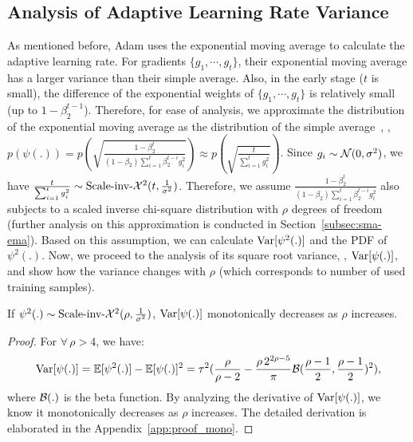 \vspace{-0.1cm}
\subsection{Analysis of Adaptive Learning Rate Variance}
\vspace{-0.1cm}
As mentioned before, Adam uses the exponential moving average to calculate the adaptive learning rate. 
For gradients $\{g_1, \cdots, g_t\}$, their exponential moving average has a larger variance than their simple average. 
Also, in the early stage ($t$ is small), the difference of the exponential weights of $\{g_1, \cdots, g_t\}$ is relatively small (up to $1 - \beta_2^{t-1}$).
Therefore, for ease of analysis, we approximate the distribution of the exponential moving average as the distribution of the simple average~\citep{nau2014forecasting}, \ie, $p(\psi(.)) = p(\sqrt{\frac{1-\beta_2^t}{(1 - \beta_2)\sum_{i = 1}^t \beta_2^{t-i}g_i^2}}) \approx p(\sqrt{\frac{t}{\sum_{i=1}^t g_i^2}})$. Since $g_i \sim {\mathcal{N}}(0, \sigma^2)$, we have $\frac{t}{\sum_{i=1}^t g_i^2} \sim \mbox{Scale-inv-}\mathcal{X}^2(t, \frac{1}{\sigma^2})$. 
Therefore, we assume $\frac{1-\beta_2^t}{(1 - \beta_2)\sum_{i = 1}^t \beta_2^{t-i}g_i^2}$ also subjects to a scaled inverse chi-square distribution with $\rho$ degrees of freedom (further analysis on this approximation is conducted in Section~\ref{subsec:sma-ema}). 
Based on this assumption, we can calculate $\operatorname{{\rm Var}}[\psi^2(.)]$ and the PDF of $\psi^2(.)$.
Now, we proceed to the analysis of its square root variance, \ie, $\operatorname{{\rm Var}}[\psi(.)]$, and show how the variance changes with $\rho$ (which corresponds to number of used training samples). 

\vspace{-0.1cm}
\begin{theorem}
If $\psi^2(.) \sim \mbox{Scale-inv-}\mathcal{X}^2(\rho, \frac{1}{\sigma^2})$, $\operatorname{{\rm Var}}[\psi(.)]$ monotonically decreases as $\rho$ increases.
\label{theorem: variance_mono}
\end{theorem}
\vspace{-0.5cm}
\begin{proof}
For $\forall\, \rho > 4$, we have:
\begin{align}
\operatorname{{\rm Var}}[\psi(.)] =
\operatorname{\mathbb{E}}[\psi^2(.)] - \operatorname{\mathbb{E}}[\psi(.)]^2 
= \tau^2 (\frac{\rho}{\rho-2} - \frac{\rho \,2^{2\rho - 5}}{\pi}{\mathcal{B}}(\frac{\rho-1}{2}, \frac{\rho-1}{2})^2),
\label{eqn:analytic-sqrt-var}
\end{align}
where ${\mathcal{B}}(.)$ is the beta function. 
By analyzing the derivative of $\operatorname{{\rm Var}}[\psi(.)]$, we know it monotonically decreases as $\rho$ increases. 
The detailed derivation is elaborated in the Appendix~\ref{app:proof_mono}. 
\end{proof}
\vspace{-0.3cm}

